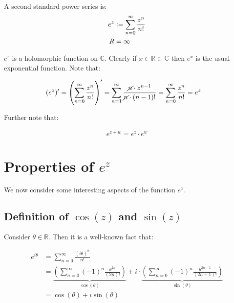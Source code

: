 \begin{example} A second standard power series is:
\begin{align*}
    e^z&\vcentcolon=\sum_{n=0}^\infty \frac{z^n}{n!}\\
    R&= \infty\\
\end{align*}

$e^z$ is a holomorphic function on $\mathbb{C}$. Clearly if $x\in\mathbb{R}\subset\mathbb{C}$ then $e^x$ is the usual exponential function. Note that:

\begin{align*}
    (e^z)' &= \left( \sum_{n=0}^\infty \frac{z^n}{n!} \right)'= \sum_{n=1}^\infty \frac{\cancel{n}\cdot z^{n-1}}{\cancel{n}\cdot (n-1)!}= \sum_{n=0}^\infty \frac{z^n}{n!}= e^z
\end{align*}

Further note that:

\begin{align*}
    e^{z+w} = e^z\cdot e^w
\end{align*}
\end{example}

\section{Properties of $e^z$}
We now consider some interesting aspects of the function $e^x$.
\subsection{Definition of $\cos(z)$ and $\sin(z)$}

Consider $\theta \in \mathbb{R}$. Then it is a well-known fact that:

\begin{align*}
    e^{i\theta}&=\sum_{n=0}^\infty \frac{(i\theta)^n}{n!}\\
    &= \underbrace{\left( \sum_{n=0}^\infty (-1)^n \frac{\theta^{2n}}{(2n)!}  \right)}_{\cos(\theta)} + i \cdot \underbrace{\left( \sum_{n=0}^\infty (-1)^n \frac{\theta^{2n+1}}{(2n+1)!}  \right)}_{\sin(\theta)}\\
    &= \cos(\theta)+i\sin(\theta)
\end{align*}

